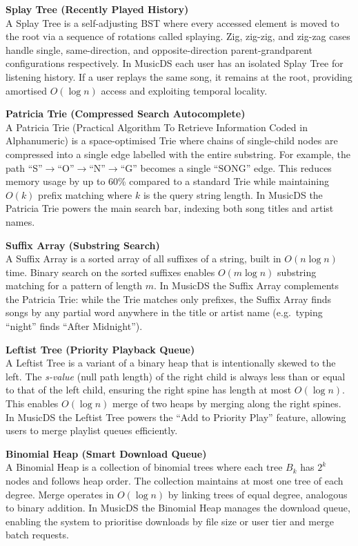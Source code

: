 \documentclass[12pt, a4paper]{article}
\begin{document}
\textbf{Splay Tree (Recently Played History)}\\
A Splay Tree is a self-adjusting BST where every accessed element is moved to the root via a sequence of rotations called splaying. Zig, zig-zig, and zig-zag cases handle single, same-direction, and opposite-direction parent-grandparent configurations respectively. In MusicDS each user has an isolated Splay Tree for listening history. If a user replays the same song, it remains at the root, providing amortised $O(\log n)$ access and exploiting temporal locality.

\textbf{Patricia Trie (Compressed Search Autocomplete)}\\
A Patricia Trie (Practical Algorithm To Retrieve Information Coded in Alphanumeric) is a space-optimised Trie where chains of single-child nodes are compressed into a single edge labelled with the entire substring. For example, the path ``S''$\to$``O''$\to$``N''$\to$``G'' becomes a single ``SONG'' edge. This reduces memory usage by up to 60\% compared to a standard Trie while maintaining $O(k)$ prefix matching where $k$ is the query string length. In MusicDS the Patricia Trie powers the main search bar, indexing both song titles and artist names.

\textbf{Suffix Array (Substring Search)}\\
A Suffix Array is a sorted array of all suffixes of a string, built in $O(n \log n)$ time. Binary search on the sorted suffixes enables $O(m \log n)$ substring matching for a pattern of length $m$. In MusicDS the Suffix Array complements the Patricia Trie: while the Trie matches only prefixes, the Suffix Array finds songs by any partial word anywhere in the title or artist name (e.g.\ typing ``night'' finds ``After Midnight'').

\textbf{Leftist Tree (Priority Playback Queue)}\\
A Leftist Tree is a variant of a binary heap that is intentionally skewed to the left. The \textit{s-value} (null path length) of the right child is always less than or equal to that of the left child, ensuring the right spine has length at most $O(\log n)$. This enables $O(\log n)$ merge of two heaps by merging along the right spines. In MusicDS the Leftist Tree powers the ``Add to Priority Play'' feature, allowing users to merge playlist queues efficiently.

\textbf{Binomial Heap (Smart Download Queue)}\\
A Binomial Heap is a collection of binomial trees where each tree $B_k$ has $2^k$ nodes and follows heap order. The collection maintains at most one tree of each degree. Merge operates in $O(\log n)$ by linking trees of equal degree, analogous to binary addition. In MusicDS the Binomial Heap manages the download queue, enabling the system to prioritise downloads by file size or user tier and merge batch requests.
\end{document}
